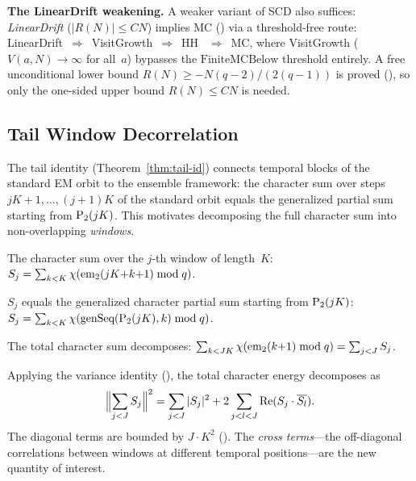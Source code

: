 \medskip
\noindent\textbf{The LinearDrift weakening.}\enspace
A weaker variant of SCD also suffices: \emph{LinearDrift}
($|R(N)| \leq CN$) implies MC
()
via a threshold-free route:
LinearDrift~$\Rightarrow$~VisitGrowth~$\Rightarrow$~HH%
~$\Rightarrow$~MC, where VisitGrowth ($V(a,N) \to \infty$ for
all~$a$) bypasses the $\mathrm{FiniteMCBelow}$ threshold entirely.
A free unconditional lower bound
$R(N) \geq -N(q{-}2)/(2(q{-}1))$ is proved
(), so only the one-sided upper
bound $R(N) \leq CN$ is needed.

\subsection{Tail Window Decorrelation}
\label{sec:twd}

The tail identity (Theorem~\ref{thm:tail-id}) connects temporal
blocks of the standard EM orbit to the ensemble framework: the
character sum over steps $jK{+}1, \ldots, (j{+}1)K$ of the standard
orbit equals the generalized partial sum starting from $\mathrm{P}_{2}(jK)$.
This motivates decomposing the full character sum into non-overlapping
\emph{windows}.

\begin{definition}
The character sum over the $j$-th window of length~$K$:
$S_j = \sum_{k < K} \chi(\mathrm{em}_{2}(jK{+}k{+}1) \bmod q)$.
\end{definition}

\begin{theorem}
$S_j$ equals the generalized character partial sum
starting from $\mathrm{P}_{2}(jK)$:
$S_j = \sum_{k<K} \chi(\text{genSeq}(\mathrm{P}_{2}(jK), k) \bmod q)$.
\end{theorem}

\begin{theorem}
\label{thm:window-decomp}
The total character sum decomposes:
$\sum_{k < JK} \chi(\mathrm{em}_{2}(k{+}1) \bmod q) = \sum_{j<J} S_j$.
\end{theorem}

Applying the variance identity
(),
the total character energy decomposes as
\[
  \Bigl\|\sum_{j<J} S_j\Bigr\|^2
  = \sum_{j<J} |S_j|^2
  + 2 \sum_{j < l < J} \mathrm{Re}(S_j \cdot \overline{S_l}).
\]
The diagonal terms are bounded by $J \cdot K^2$
().
The \emph{cross terms}---the off-diagonal correlations between
windows at different temporal positions---are the new quantity of
interest.

